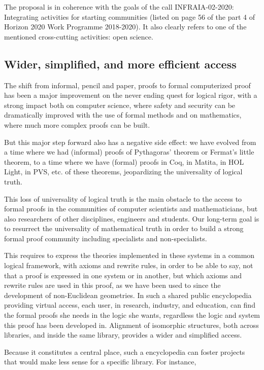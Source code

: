 The proposal is in coherence with the goals of the call INFRAIA-02-2020:
Integrating activities for starting communities (listed on page 56 of
the part 4 of Horizon 2020 Work Programme 2018-2020). It also clearly
refers to one of the mentioned cross-cutting activities: open science.

\subsection{Wider, simplified, and more efficient access}

The shift from informal, pencil and paper, proofs to formal
computerized proof has been a major improvement on the never ending
quest for logical rigor, with a strong impact both on computer
science, where safety and security can be dramatically improved with
the use of formal methods and on mathematics, where much more complex
proofs can be built.

But this major step forward also has a negative side effect: we have
evolved from a time where we had (informal) proofs of Pythagoras'
theorem or Fermat's little theorem, to a time where we have (formal)
proofs in {\sf Coq}, in {\sf Matita}, in {\sf HOL Light}, in {\sf
  PVS}, etc.  of these theorems, jeopardizing the universality of
logical truth.

This loss of universality of logical truth is the main obstacle to the
access to formal proofs in the communities of computer scientists and
mathematicians, but also researchers of other disciplines, engineers
and students.  Our long-term goal is to resurrect the universality of
mathematical truth in order to build a strong formal proof community
including specialists and non-specialists.

This requires to express the theories implemented in these systems in
a common logical framework, with axioms and rewrite rules, in order
to be able to say, not that a proof is expressed in one system or in
another, but which axioms and rewrite rules are used in this proof,
as we have been used to since the development of non-Euclidean
geometries. In such a shared public encyclopedia providing virtual
access, each user, in research, industry, and education, can find the
formal proofs she needs in the logic she wants, regardless the logic
and system this proof has been developed in.  Alignment of isomorphic
structures, both across libraries, and inside the same library,
provides a wider and simplified access.

Because it constitutes a central place, such a encyclopedia can foster
projects that would make less sense for a specific library. For instance,


